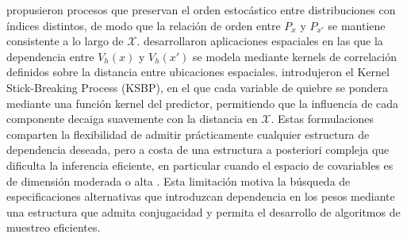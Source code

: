 \citet{02_06_griffin2006order} propusieron procesos que preservan el orden estocástico entre distribuciones con índices distintos, de modo que la relación de orden entre $P_x$ y $P_{x'}$ se mantiene consistente a lo largo de $\mathcal{X}$. \citet{02_06_reich2007multivariate} desarrollaron aplicaciones espaciales en las que la dependencia entre $V_h(x)$ y $V_h(x')$ se modela mediante kernels de correlación definidos sobre la distancia entre ubicaciones espaciales. \citet{02_06_dunson2008kernel} introdujeron el Kernel Stick-Breaking Process (KSBP), en el que cada variable de quiebre se pondera mediante una función kernel del predictor, permitiendo que la influencia de cada componente decaiga suavemente con la distancia en $\mathcal{X}$. Estas formulaciones comparten la flexibilidad de admitir prácticamente cualquier estructura de dependencia deseada, pero a costa de una estructura a posteriori compleja que dificulta la inferencia eficiente, en particular cuando el espacio de covariables es de dimensión moderada o alta \citep{03_02_chung2009nonparametric}. Esta limitación motiva la búsqueda de especificaciones alternativas que introduzcan dependencia en los pesos mediante una estructura que admita conjugacidad y permita el desarrollo de algoritmos de muestreo eficientes.

